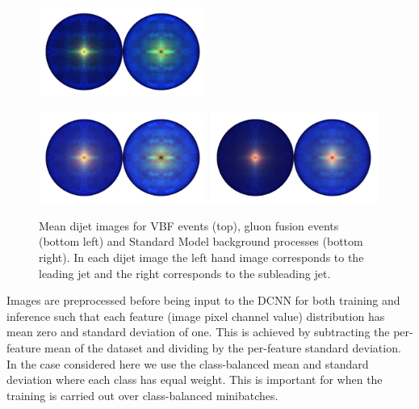 \begin{figure}[h!]

    \includegraphics[width=0.49\textwidth]{figures/event_selection/mean_vbf_LPS_uw.pdf}
    \begin{center}
        \includegraphics[width=0.49\textwidth]{figures/event_selection/mean_ggh_LPS_uw.pdf}
        \includegraphics[width=0.49\textwidth]{figures/event_selection/mean_bkg_LPS_uw.pdf}
    \end{center}
    \caption{Mean dijet images for VBF events (top), gluon fusion events (bottom left) and Standard Model background processes (bottom right). In each dijet image the left hand image corresponds to the leading jet and the right corresponds to the subleading jet.}
    \label{fig:event_categorisation:mean_jet_images}
\end{figure}

Images are preprocessed before being input to the DCNN for both training and inference such that each feature (image pixel channel value) distribution has mean zero and standard deviation of one. 
This is achieved by subtracting the per-feature mean of the dataset and dividing by the per-feature standard deviation.
In the case considered here we use the class-balanced mean and standard deviation where each class has equal weight. This is important for when the training is carried out over class-balanced minibatches.



